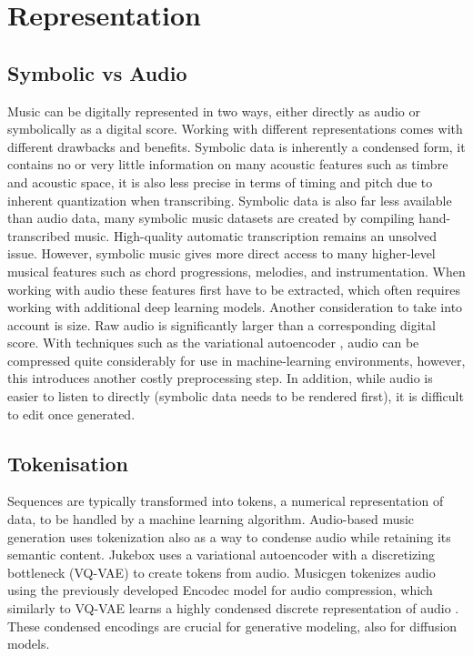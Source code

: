 \section{Representation}
\label{representation}
\subsection{Symbolic vs Audio}
Music can be digitally represented in two ways, either directly as audio or symbolically as a digital score. Working with different representations comes with different drawbacks and benefits. Symbolic data is inherently a condensed form, it contains no or very little information on many acoustic features such as timbre and acoustic space, it is also less precise in terms of timing and pitch due to inherent quantization when transcribing. Symbolic data is also far less available than audio data, many symbolic music datasets are created by compiling hand-transcribed music. High-quality automatic transcription remains an unsolved issue.\cite{Ji_Yang_Luo_survey_symbolic_2024}\cite{Chen_Smith_Spijkervet_Wang_Zou_Li_Kong_Du_2024}  However, symbolic music gives more direct access to many higher-level musical features such as chord progressions, melodies, and instrumentation. When working with audio these features first have to be extracted, which often requires working with additional deep learning models. Another consideration to take into account is size. Raw audio is significantly larger than a corresponding digital score. With techniques such as the variational autoencoder \cite{Kingma_Welling_2014}, audio can be compressed quite considerably for use in machine-learning environments, however, this introduces another costly preprocessing step. In addition, while audio is easier to listen to directly (symbolic data needs to be rendered first), it is difficult to edit once generated. 


\subsection{Tokenisation}
Sequences are typically transformed into tokens, a numerical representation of data, to be handled by a machine learning algorithm. Audio-based music generation uses tokenization also as a way to condense audio while retaining its semantic content. Jukebox \cite{Dhariwal_Jun_Payne_Kim_Radford_Sutskever_2020} uses a variational autoencoder\cite{Kingma_Welling_2014} with a discretizing bottleneck (VQ-VAE) to create tokens from audio. Musicgen \cite{copet2023simple} tokenizes audio using the previously developed Encodec model for audio compression, which similarly to VQ-VAE learns a highly condensed discrete representation of audio \cite{Défossez_2023_encodec}. These condensed encodings are crucial for generative modeling, also for diffusion models.

